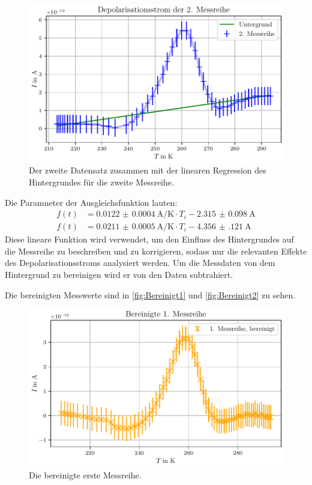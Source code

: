 \begin{figure}[H]
    \centering
    \includegraphics[width=\textwidth]{plots/C_messreihe2.pdf}
    \caption{Der zweite Datensatz zusammen mit der linearen Regression des Hintergrundes für die zweite Messreihe.}
    \label{fig:Hintergrund2}
\end{figure}

Die Paramneter der Ausgleichsfunktion lauten:
\begin{align*}
f(t) &= \qty{0.0122(4)}{\ampere\per\kelvin} \cdot T_i - \qty{2.315(98)}{\ampere}\\
f(t) &= \qty{0.0211(5)}{\ampere\per\kelvin} \cdot T_i - \qty{4.356(121)}{\ampere}
\end{align*}
Diese lineare Funktion wird verwendet, um den Einfluss des Hintergrundes auf die Messreihe zu beschreiben und zu korrigieren,
sodass nur die relevanten Effekte des Depolarisationsstroms analysiert werden. Um die Messdaten von dem 
Hintergrund zu bereinigen wird er von den Daten subtrahiert.

Die bereinigten Messwerte sind in \autoref{fig:Bereinigt1} und \ref{fig:Bereinigt2}  zu sehen.

\begin{figure}[H]
    \centering
    \includegraphics[width=\textwidth]{plots/D_messreihe1_bereinigt.pdf}
    \caption{Die bereinigte erste Messreihe.}
    \label{fig:Bereinigt1}
\end{figure}

